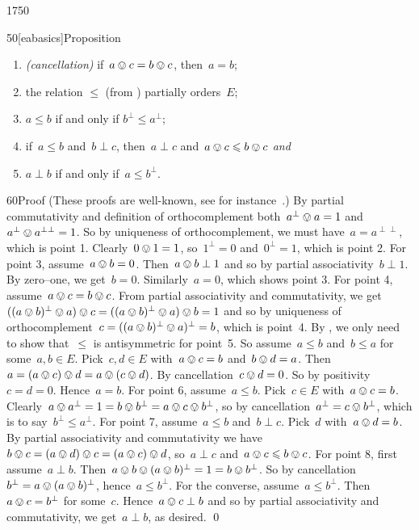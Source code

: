 \begin{parsec}{1750}
\begin{point}{50}[eabasics]{Proposition}
\begin{enumerate}
    \item \emph{(cancellation)}
        if~$a\ovee c = b\ovee c$, then~$a = b$;
    \item the relation  $\leq$ (from ) partially orders~$E$;
    \item $a \leq b$ if and only if $b^\perp \leq a^\perp$;
    \item if~$a \leq b$ and~$b \perp c$, then~$a \perp c$
        and~$a \ovee c \leq b \ovee c$ \emph{and}
    \item $a \perp b$ if and only if~$a \leq b^\perp$.
\end{enumerate}
\spacingfix{}
\begin{point}{60}{Proof}%
(These proofs are well-known,
    see for instance~\cite{dvurecenskij2013new}.)
By partial commutativity and definition
of orthocomplement both~$a^\perp \ovee a = 1$
and~$a^\perp \ovee  a^{\perp\perp} = 1$.
So by uniqueness of orthocomplement,
    we must have~$a= a^{\perp\perp}$, which is point 1.
Clearly~$0 \ovee 1 = 1$,
    so~$1^\perp = 0$ and~$0^\perp = 1$,
    which is point 2.
For point 3, assume~$a \ovee b = 0$.
Then~$a \ovee b \perp 1$
    and so by partial associativity~$b \perp 1$.
    By zero--one, we get~$b = 0$.
    Similarly~$a=0$, which shows point 3.
For point 4, assume~$ a \ovee c = b \ovee c$.
From partial associativity and commutativity, we get
$ ((a \ovee b)^\perp\ovee a) \ovee c = 
    ((a \ovee b)^\perp\ovee a) \ovee b  =  1$
and so by uniqueness of
orthocomplement~$c = ((a\ovee b)^\perp\ovee a)^\perp = b$,
    which is point~4.
By ,
    we only need to show that~$\leq$ is antisymmetric
    for point~5.
So assume~$a \leq b$ and~$b \leq a$
    for some~$a,b\in E$.
Pick~$c,d \in E$ with~$a \ovee c = b$ and~$b \ovee d = a$.
Then~$a = (a \ovee c) \ovee d = a \ovee (c \ovee d)$.
By cancellation~$c \ovee d = 0$.
So by positivity~$c = d= 0$.
Hence~$a = b$.
For point 6, assume~$a\leq b$.
Pick~$c \in E$ with~$a \ovee c = b$.
Clearly~$a \ovee a^\perp = 1 = b \ovee b^\perp = a \ovee c \ovee b^\perp$,
so by cancellation~$a^\perp = c \ovee b^\perp$,
    which is to say~$b^\perp \leq a^\perp$.
For point 7, assume~$a \leq b$ and~$b \perp c$.
Pick~$d$ with~$a \ovee d = b$.
By partial associativity and commutativity
    we have~$b \ovee c = (a \ovee d) \ovee c = (a \ovee c) \ovee d$,
    so~$a \perp c$ and~$a \ovee c \leq b \ovee c$.
For point 8, first assume~$a \perp b$.
Then~$a \ovee b \ovee (a \ovee b)^\perp = 1 = b \ovee b^\perp$.
So by cancellation~$b^\perp = a \ovee (a \ovee b)^\perp$,
hence~$a \leq b^\perp$.
For the converse, assume~$a \leq b^\perp$.
Then~$a \ovee c = b^\perp$ for some~$c$.
Hence~$a \ovee c \perp b$
    and so  by partial associativity and commutativity,
        we get~$a \perp b$, as desired.
    \qed
\end{point}
\end{point}
\end{parsec}%

